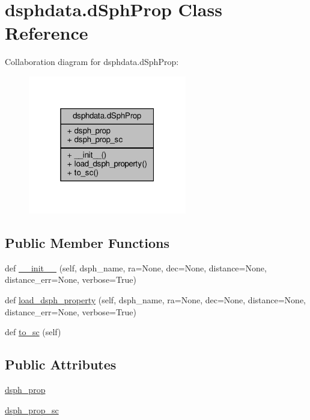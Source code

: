\hypertarget{classdsphdata_1_1dSphProp}{}\section{dsphdata.\+d\+Sph\+Prop Class Reference}
\label{classdsphdata_1_1dSphProp}


Collaboration diagram for dsphdata.\+d\+Sph\+Prop\+:\nopagebreak
\begin{figure}[H]
\begin{center}
\leavevmode
\includegraphics[width=196pt]{d4/d30/classdsphdata_1_1dSphProp__coll__graph}
\end{center}
\end{figure}
\subsection*{Public Member Functions}
\begin{DoxyCompactItemize}
\item 
def \hyperlink{classdsphdata_1_1dSphProp_ae1a65e0fa31a216d8682f7b0c82a17bc}{\+\_\+\+\_\+init\+\_\+\+\_\+} (self, dsph\+\_\+name, ra=None, dec=None, distance=None, distance\+\_\+err=None, verbose=True)
\item 
def \hyperlink{classdsphdata_1_1dSphProp_a137f39efeed4c5ac45617e401d500a12}{load\+\_\+dsph\+\_\+property} (self, dsph\+\_\+name, ra=None, dec=None, distance=None, distance\+\_\+err=None, verbose=True)
\item 
def \hyperlink{classdsphdata_1_1dSphProp_a4a025a2eaf8f2a3c24f0cb78e82c046a}{to\+\_\+sc} (self)
\end{DoxyCompactItemize}
\subsection*{Public Attributes}
\begin{DoxyCompactItemize}
\item 
\hyperlink{classdsphdata_1_1dSphProp_aabd823cddc1788bdec1832e66b561fed}{dsph\+\_\+prop}
\item 
\hyperlink{classdsphdata_1_1dSphProp_aeccdbe40f92c40609af736edef043363}{dsph\+\_\+prop\+\_\+sc}
\end{DoxyCompactItemize}


